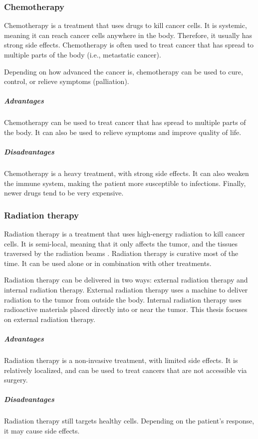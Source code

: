 \subsubsection{Chemotherapy}
Chemotherapy is a treatment that uses drugs to kill cancer cells.
It is systemic, meaning it can reach cancer cells anywhere in the body.
Therefore, it usually has strong side effects.
Chemotherapy is often used to treat cancer that has spread to multiple parts of the body (i.e., metastatic cancer).

Depending on how advanced the cancer is, chemotherapy can be used to cure, control, or relieve symptoms (palliation).

\subparagraph{Advantages}
Chemotherapy can be used to treat cancer that has spread to multiple parts of the body.
It can also be used to relieve symptoms and improve quality of life.

\subparagraph{Disadvantages}
Chemotherapy is a heavy treatment, with strong side effects.
It can also weaken the immune system, making the patient more susceptible to infections.
Finally, newer drugs tend to be very expensive.

\subsubsection{Radiation therapy}
Radiation therapy is a treatment that uses high-energy radiation to kill cancer cells.
It is semi-local, meaning that it only affects the tumor, and the tissues traversed by the radiation beams \cite{Thariat2013}.
Radiation therapy is curative most of the time.
It can be used alone or in combination with other treatments.

Radiation therapy can be delivered in two ways: external radiation therapy and internal radiation therapy.
External radiation therapy uses a machine to deliver radiation to the tumor from outside the body.
Internal radiation therapy uses radioactive materials placed directly into or near the tumor.
This thesis focuses on external radiation therapy.

\subparagraph{Advantages}
Radiation therapy is a non-invasive treatment, with limited side effects.
It is relatively localized, and can be used to treat cancers that are not accessible via surgery.

\subparagraph{Disadvantages}
Radiation therapy still targets healthy cells.
Depending on the patient's response, it may cause side effects.

